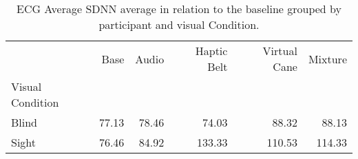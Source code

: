 
\begin{table}[!htb]
\centering
\caption{ECG Average SDNN average in relation to the baseline grouped by participant and visual Condition.}
\label{tab:sdnn_average_group}
\begin{tabular}{lrrrrr}
\toprule
{} &   Base &  Audio & Haptic Belt & Virtual Cane & Mixture \\
Visual Condition &        &        &             &              &         \\
\midrule
Blind            &  77.13 &  78.46 &       74.03 &        88.32 &   88.13 \\
Sight            &  76.46 &  84.92 &      133.33 &       110.53 &  114.33 \\
\bottomrule
\end{tabular}
\end{table}

